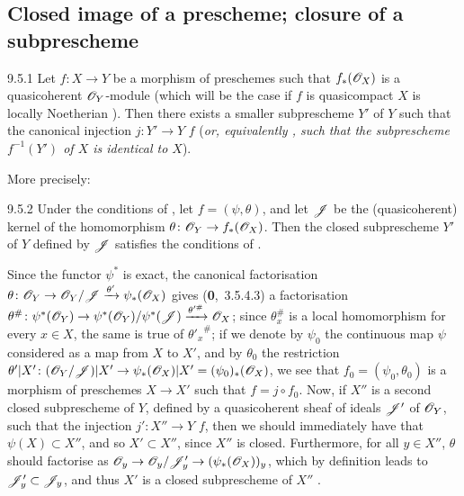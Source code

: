 \documentclass{book}
\begin{document}
\subsection{Closed image of a prescheme; closure of a subprescheme}
\label{1-schemes-9.5}        

\begin{envs}[Proposition]{9.5.1}
\label{prop-1.9.5.1}
Let $f\colon X\to Y$ be a morphism of preschemes
such that $f_\ast(\mathscr{O}_X)$ is a quasicoherent $\mathscr{O}_Y$-module (which will be the
case if $f$ is quasicompact  $X$ is locally Noetherian
). Then there exists a smaller subprescheme $Y'$ of $Y$ such that
the canonical injection $j\colon Y'\to Y$ \completelyunsure $f$ (\emph{or, equivalently
, such that the subprescheme $f^{-1}(Y')$ of $X$ is \emph{identical}
to $X$}).
\end{envs}

More precisely:

\begin{envs}[Corollary]{9.5.2}
\label{cor-1.9.5.2}
Under the conditions of , let
$f=(\psi,\theta)$, and let $\mathscr{J}$ be the (quasicoherent) kernel of the
homomorphism $\theta\colon\mathscr{O}_Y\to f_\ast(\mathscr{O}_X)$. Then the closed subprescheme
$Y'$ of $Y$ defined by $\mathscr{J}$ satisfies the conditions of .
\end{envs}

Since the functor $\psi^\ast$ is exact, the canonical factorisation
$\theta\colon\mathscr{O}_Y\to\mathscr{O}_Y/\mathscr{J}\xrightarrow{\theta'}\psi_\ast(\mathscr{O}_X)$ gives
(\textbf{0},~3.5.4.3) a factorisation
$\theta^\#\colon\psi^\ast(\mathscr{O}_Y)\to\psi^\ast(\mathscr{O}_Y)/\psi^\ast(\mathscr{J})
\xrightarrow{\theta'^\#}\mathscr{O}_X$;
since $\theta_x^\#$ is a local homomorphism for every $x\in X$, the same is true
of ${\theta'_x}^\#$; if we denote by $\psi_0$ the continuous map $\psi$
considered as a map from $X$ to $X'$, and by $\theta_0$ the restriction
$\theta'|X'\colon(\mathscr{O}_Y/\mathscr{J})|X'\to\psi_\ast(\mathscr{O}_X)|X'=(\psi_0)_\ast(\mathscr{O}_X)$,
we see that $f_0=(\psi_0,\theta_0)$ is a morphism of preschemes $X\to X'$
 such that $f=j\circ f_0$. Now, if $X''$ is a second
closed subprescheme of $Y$, defined by a quasicoherent sheaf of ideals
$\mathscr{J}'$ of $\mathscr{O}_Y$, such that the injection $j'\colon X''\to Y$ \completelyunsure
$f$, then we should immediately have that $\psi(X)\subset X''$, and so
$X'\subset X''$, since $X''$ is closed. Furthermore, for all $y\in X''$,
$\theta$ should factorise as $\mathscr{O}_y\to\mathscr{O}_y/\mathscr{J}'_y\to(\psi_\ast(\mathscr{O}_X))_y$,
which by definition leads to $\mathscr{J}'_y\subset\mathscr{J}_y$, and thus $X'$ is
a closed subprescheme of $X''$ .
\end{document}
